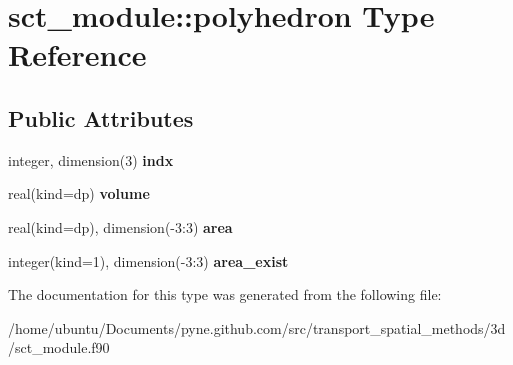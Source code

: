 \hypertarget{structsct__module_1_1polyhedron}{}\section{sct\+\_\+module\+:\+:polyhedron Type Reference}
\label{structsct__module_1_1polyhedron}
\subsection*{Public Attributes}
\begin{DoxyCompactItemize}
\item 
integer, dimension(3) {\bfseries indx}\hypertarget{structsct__module_1_1polyhedron_a0a9f5f4cc18647a9ebeb2318bc83dfa7}{}\label{structsct__module_1_1polyhedron_a0a9f5f4cc18647a9ebeb2318bc83dfa7}

\item 
real(kind=dp) {\bfseries volume}\hypertarget{structsct__module_1_1polyhedron_a20eae3d573880fd36935c35d3b1d6c75}{}\label{structsct__module_1_1polyhedron_a20eae3d573880fd36935c35d3b1d6c75}

\item 
real(kind=dp), dimension(-\/3\+:3) {\bfseries area}\hypertarget{structsct__module_1_1polyhedron_aa39269bf2d196995f86f0b365b7c46dd}{}\label{structsct__module_1_1polyhedron_aa39269bf2d196995f86f0b365b7c46dd}

\item 
integer(kind=1), dimension(-\/3\+:3) {\bfseries area\+\_\+exist}\hypertarget{structsct__module_1_1polyhedron_a4d8b6322e32640812e3c917645febc0b}{}\label{structsct__module_1_1polyhedron_a4d8b6322e32640812e3c917645febc0b}

\end{DoxyCompactItemize}


The documentation for this type was generated from the following file\+:\begin{DoxyCompactItemize}
\item 
/home/ubuntu/\+Documents/pyne.\+github.\+com/src/transport\+\_\+spatial\+\_\+methods/3d/sct\+\_\+module.\+f90\end{DoxyCompactItemize}
